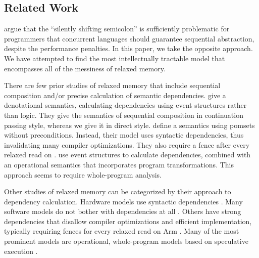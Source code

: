 \subsection{Related Work}

\citet{DBLP:conf/snapl/MarinoMMNS15} argue that the ``silently shifting
semicolon'' is sufficiently problematic for programmers that concurrent
languages should guarantee sequential abstraction, despite the performance
penalties.  In this paper, we take the opposite approach.  We have
attempted to find the most intellectually tractable model that encompasses
all of the messiness of relaxed memory.

There are few prior studies of relaxed memory that include sequential
composition and/or precise calculation of semantic dependencies.
\citet{DBLP:conf/esop/PaviottiCPWOB20} give a denotational semantics,
calculating dependencies using event structures rather than logic.  They give
the semantics of sequential composition in continuation passing style,
whereas we give it in direct style.
%
\citet{DBLP:journals/corr/abs-1804-04214} define a semantics
using pomsets without preconditions. Instead, their model uses syntactic
dependencies, thus invalidating many compiler optimizations.  They also
require a fence after every relaxed read on \armeight{}.
%
\citet{Pichon-Pharabod:2016:CSR:2837614.2837616} use event structures to
calculate dependencies, combined with an operational semantics that
incorporates program transformations.  This approach seems to require
whole-program analysis.

Other studies of relaxed memory can be categorized by their approach to
dependency calculation.  Hardware models use syntactic dependencies
\cite{alglave}.  Many software models do not bother with dependencies at all
\cite{Batty:2011:MCC:1926385.1926394, DBLP:journals/pacmpl/WattRP19,
  DBLP:conf/pldi/WattPPBDFPG20, goMM}.  Others have strong dependencies that
disallow compiler optimizations and efficient implementation, typically
requiring fences for every relaxed read on Arm
\cite{Lamport:1979:MMC:1311099.1311750, DBLP:conf/pldi/LahavVKHD17,
  Dolan:2018:BDR:3192366.3192421, DBLP:conf/lics/JeffreyR16,
  Boehm:2014:OGA:2618128.2618134}. %
%
Many of the most prominent models are operational, whole-program models based
on speculative execution \cite{Manson:2005:JMM:1047659.1040336,
  DBLP:conf/esop/JagadeesanPR10,
  DBLP:conf/popl/KangHLVD17,DBLP:journals/pacmpl/ChakrabortyV19,DBLP:conf/pldi/LeeCPCHLV20,promising-ldrf}.

